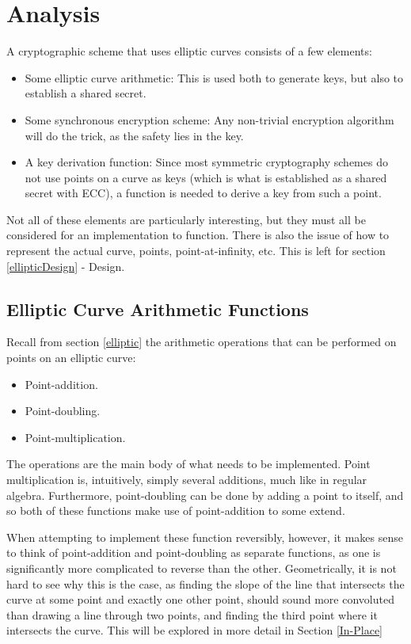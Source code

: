 \section{Analysis}
\label{ellipticAnalysis}
A cryptographic scheme that uses elliptic curves consists of a few elements:
\begin{itemize}
\item Some elliptic curve arithmetic: This is used both to generate keys, but also to establish a shared secret.
\item Some synchronous encryption scheme: Any non-trivial encryption algorithm will do the trick, as the safety lies in the key.
\item A key derivation function: Since most symmetric cryptography schemes do not use points on a curve as keys (which is what is established as a shared secret with ECC), a function is needed to derive a key from such a point. 
\end{itemize}
Not all of these elements are particularly interesting, but they must all be considered for an implementation to function. There is also the issue of how to represent the actual curve, points, point-at-infinity, etc. This is left for section \ref{ellipticDesign} - Design. 
\subsection{Elliptic Curve Arithmetic Functions}
Recall from section \ref{elliptic} the arithmetic operations that can be performed on points on an elliptic curve:
\begin{itemize}
\item Point-addition.
\item Point-doubling.
\item Point-multiplication.
\end{itemize}
The operations are the main body of what needs to be implemented. Point multiplication is, intuitively, simply several additions, much like in regular algebra. Furthermore, point-doubling can be done by adding a point to itself, and so both of these functions make use of point-addition to some extend.

When attempting to implement these function reversibly, however, it makes sense to think of point-addition and point-doubling as separate functions, as one is significantly more complicated to reverse than the other. Geometrically, it is not hard to see why this is the case, as finding the slope of the line that intersects the curve at some point and exactly one other point, should sound more convoluted than drawing a line through two points, and finding the third point where it intersects the curve. This will be explored in more detail in Section \ref{In-Place}

